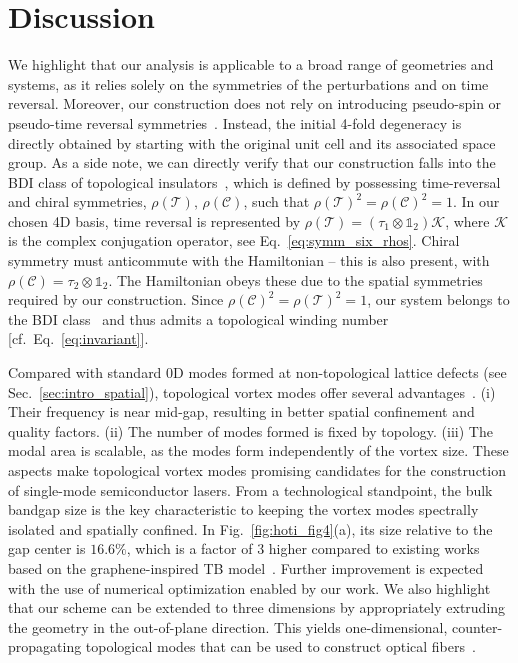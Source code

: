 \section{Discussion}

We highlight that our analysis is applicable to a broad range of geometries and systems, as it relies solely on the symmetries of the perturbations and on time reversal. Moreover, our construction does not rely on introducing pseudo-spin or pseudo-time reversal symmetries~\cite{Wu_Hu_2015}. Instead, the initial 4-fold degeneracy is directly obtained by starting with the original unit cell and its associated space group. As a side note, we can directly verify that our construction falls into the BDI class of topological insulators~\cite{Teo_2010}, which is defined by possessing time-reversal and chiral symmetries, $\rho(\mathcal{T}) ,\, \rho(\mathcal{C})$, such that $\rho(\mathcal{T})^2 = \rho(\mathcal{C})^2 = 1$. In our chosen 4D basis, time reversal is represented by $\rho(\mathcal{T}) = \left( \tau_1 \otimes \mathbb{1}_2 \right) \mathcal{K}$, where $\mathcal{K}$ is the complex conjugation operator, see Eq.~\eqref{eq:symm_six_rhos}. Chiral symmetry must anticommute with the Hamiltonian -- this is also present, with $\rho(\mathcal{C}) = \tau_2 \otimes \mathbb{1}_2$. The Hamiltonian obeys these due to the spatial symmetries required by our construction. Since $\rho(\mathcal{C})^2 = \rho(\mathcal{T})^2 = 1$, our system belongs to the BDI class~\cite{Chiu_2016, Teo_2010} and thus admits a topological winding number [cf.~Eq.~\eqref{eq:invariant}].

Compared with standard 0D modes formed at non-topological lattice defects (see Sec.~\ref{sec:intro_spatial}), topological vortex modes offer several advantages~\cite{Gao_2020}. (i) Their frequency is near mid-gap, resulting in better spatial confinement and quality factors. (ii) The number of modes formed is fixed by topology.  (iii) The modal area is scalable, as the modes form independently of the vortex size. These aspects make topological vortex modes promising candidates for the construction of single-mode semiconductor lasers. From a technological standpoint, the bulk bandgap size is the key characteristic to keeping the vortex modes spectrally isolated and spatially confined. In Fig.~\ref{fig:hoti_fig4}(a), its size relative to the gap center is $16.6\%$, which is a factor of $3$ higher compared to existing works based on the graphene-inspired TB model~\cite{Gao_2020}. Further improvement is expected with the use of numerical optimization enabled by our work. We also highlight that our scheme can be extended to three dimensions by appropriately extruding the geometry in the out-of-plane direction. This yields one-dimensional, counter-propagating topological modes that can be used to construct optical fibers~\cite{Lin_2020, Lu_2018}.

